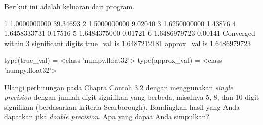 Berikut ini adalah keluaran dari program.
\begin{textcode}
  1       1.0000000000   39.34693%
  2       1.5000000000    9.02040%
  3       1.6250000000    1.43876%
  4       1.6458333731    0.17516%
  5       1.6484375000    0.01721%
  6       1.6486979723    0.00141%
Converged within 3 significant digits
true_val   is       1.6487212181
approx_val is       1.6486979723

type(true_val)   =  <class 'numpy.float32'>
type(approx_val) =  <class 'numpy.float32'>
\end{textcode}

\begin{soal}
Ulangi perhitungan pada Chapra Contoh 3.2 dengan menggunakan \textit{single precision}
dengan jumlah digit signifikan yang berbeda, misalnya 5, 8, dan 10 digit signifikan
(berdasarkan kriteria Scarborough). Bandingkan hasil yang Anda dapatkan jika
\textit{double precision}. Apa yang dapat Anda simpulkan?
\end{soal}
